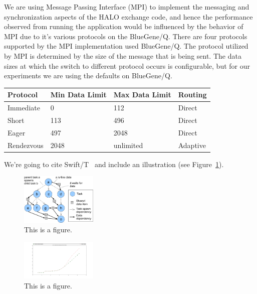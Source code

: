 \documentclass[conference,10pt]{IEEEtran}
\begin{document}

We are using Message Passing Interface (MPI) to implement the messaging and synchronization aspects of the HALO exchange code,
and hence the performance observed from running the application would be influenced by the behavior of MPI due to it's
various protocols on the BlueGene/Q. There are four protocols supported by the MPI implementation used BlueGene/Q.
The protocol utilized by MPI is determined by the size of the message that is being sent. The data sizes at which the switch to
different protocol occurs is configurable, but for our experiments we are using the defaults on BlueGene/Q. 

\begin{center}
    \begin{tabular}{ | l | l | l | p{2cm} |}
    \hline
    Protocol   & Min Data Limit & Max Data Limit & Routing \\ \hline
    Immediate  &              0 &            112 & Direct\\ \hline
    Short      &            113 &            496 & Direct\\ \hline
    Eager      &            497 &           2048 & Direct\\ \hline
    Rendezvous &           2048 &      unlimited & Adaptive\\ \hline
    \hline
    \end{tabular}
\end{center}

We're going to cite Swift/T~\cite{SwiftT_2013} and include an illustration
(see Figure~\ref{fig:task-data}).

\label{sect:ddt-model}
\begin{figure}
  \center
  \includegraphics[width=0.325\textwidth]{fig/task-data}
  \caption{This is a figure.
    \label{fig:task-data}}
\end{figure}


\label{sect:Analytic-model}
\begin{figure}
  \center
  \includegraphics[width=0.325\textwidth]{fig/Analytic_regular_no_congestion_170_304_304.png}
  \caption{This is a figure.
    \label{fig:Analytic_regular_no_congestion_170_304_304.png}}
\end{figure}
\end{document}
